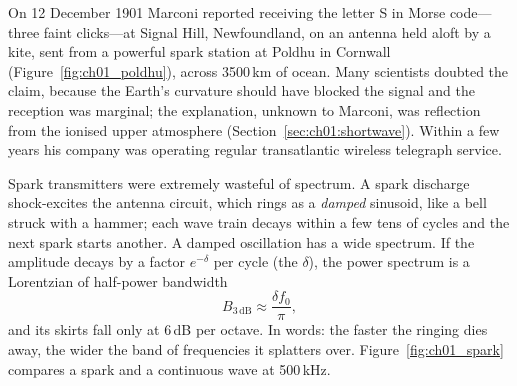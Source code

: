 
On 12 December 1901 Marconi reported receiving the letter S in Morse code---three faint clicks---at
Signal Hill, Newfoundland, on an antenna held aloft by a kite, sent from a powerful spark station at
Poldhu in Cornwall (Figure~\ref{fig:ch01_poldhu}), across 3500\,km of ocean. Many scientists doubted
the claim, because the Earth's curvature should have blocked the signal and the reception was
marginal; the explanation, unknown to Marconi, was reflection from the ionised upper atmosphere
(Section~\ref{sec:ch01:shortwave}). Within a few years his company was operating regular
transatlantic wireless telegraph service.



Spark transmitters were extremely wasteful of spectrum. A spark discharge shock-excites the antenna
circuit, which rings as a \emph{damped} sinusoid, like a bell struck with a hammer; each wave train
decays within a few tens of cycles and the next spark starts another. A damped oscillation has a wide
spectrum. If the amplitude decays by a factor $e^{-\delta}$ per cycle (the  $\delta$), the power spectrum is a Lorentzian of half-power bandwidth
\begin{equation}
B_{3\,\mathrm{dB}} \approx \frac{\delta f_0}{\pi},
\label{eq:ch01:spark}
\end{equation}
and its skirts fall only at 6\,dB per octave. In words: the faster the ringing dies away, the wider
the band of frequencies it splatters over. Figure~\ref{fig:ch01_spark} compares a spark and a
continuous wave at 500\,kHz.


